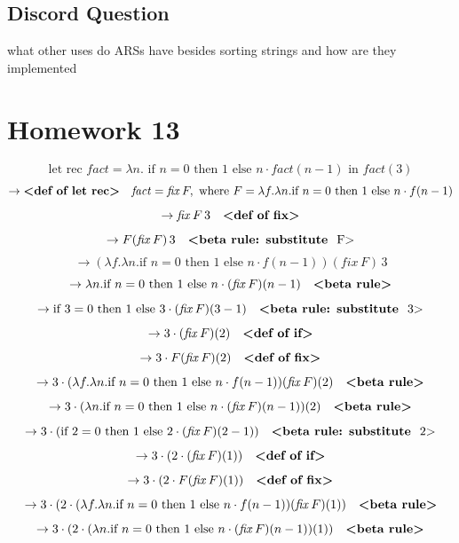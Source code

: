 \documentclass{article}
\theoremstyle{plain}
\theoremstyle{definition}
\theoremstyle{remark}
\begin{document}
\subsection{Discord Question}

what other uses do ARSs have besides sorting strings and how are they implemented 


\section{Homework 13}\label{homework13}

\[
\text{let rec } \mathit{fact} = \lambda n. \text{ if } n = 0 \text{ then } 1 \text{ else } n \cdot \mathit{fact}(n-1) \text{ in } \mathit{fact}(3)
\]
\[
\to \text{\textbf{<def of let rec>}} \quad \mathit{fact} = \mathit{fix} \, F, \text{ where } F = \lambda f. \lambda n. \text{if } n = 0 \text{ then } 1 \text{ else } n \cdot f(n-1)
\]
\[
\to \mathit{fix} \, F \, 3 \quad \text{\textbf{<def of fix>}}
\]
\[
\to F(\mathit{fix} \, F) \, 3 \quad \text{\textbf{<beta rule: substitute } F\text{>}}
\]
\[
\to (\lambda f. \lambda n. \text{if } n = 0 \text{ then } 1 \text{ else } n \cdot f(n-1))(\mathit{fix} \, F) \, 3
\]
\[
\to \lambda n. \text{if } n = 0 \text{ then } 1 \text{ else } n \cdot (\mathit{fix} \, F)(n-1) \quad \text{\textbf{<beta rule>}}
\]
\[
\to \text{if } 3 = 0 \text{ then } 1 \text{ else } 3 \cdot (\mathit{fix} \, F)(3-1) \quad \text{\textbf{<beta rule: substitute } 3\text{>}}
\]
\[
\to 3 \cdot (\mathit{fix} \, F)(2) \quad \text{\textbf{<def of if>}}
\]
\[
\to 3 \cdot F(\mathit{fix} \, F)(2) \quad \text{\textbf{<def of fix>}}
\]
\[
\to 3 \cdot (\lambda f. \lambda n. \text{if } n = 0 \text{ then } 1 \text{ else } n \cdot f(n-1))(\mathit{fix} \, F)(2) \quad \text{\textbf{<beta rule>}}
\]
\[
\to 3 \cdot (\lambda n. \text{if } n = 0 \text{ then } 1 \text{ else } n \cdot (\mathit{fix} \, F)(n-1))(2) \quad \text{\textbf{<beta rule>}}
\]
\[
\to 3 \cdot (\text{if } 2 = 0 \text{ then } 1 \text{ else } 2 \cdot (\mathit{fix} \, F)(2-1)) \quad \text{\textbf{<beta rule: substitute } 2\text{>}}
\]
\[
\to 3 \cdot (2 \cdot (\mathit{fix} \, F)(1)) \quad \text{\textbf{<def of if>}}
\]
\[
\to 3 \cdot (2 \cdot F(\mathit{fix} \, F)(1)) \quad \text{\textbf{<def of fix>}}
\]
\[
\to 3 \cdot (2 \cdot (\lambda f. \lambda n. \text{if } n = 0 \text{ then } 1 \text{ else } n \cdot f(n-1))(\mathit{fix} \, F)(1)) \quad \text{\textbf{<beta rule>}}
\]
\[
\to 3 \cdot (2 \cdot (\lambda n. \text{if } n = 0 \text{ then } 1 \text{ else } n \cdot (\mathit{fix} \, F)(n-1))(1)) \quad \text{\textbf{<beta rule>}}
\]
\end{document}
